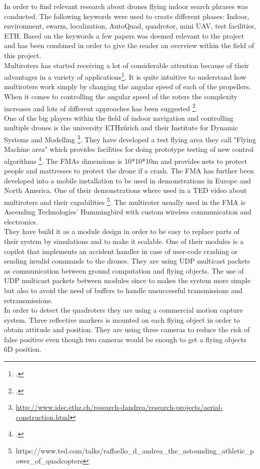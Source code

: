 In order to find relevant research about drones flying indoor search phrases was conducted.
The following keywords were used to create different phases: Indoor, environment, swarm, localization, AutoQuad, quadrotor, mini UAV, test facilities, ETH.
Based on the keywords a few papers was deemed relevant to the project and has been combined in order to give the reader an overview within the field of this project. \\


Multiroters has started receiving a lot of considerable attention because of their advantages in a variety of applications\footcite{kang2015indoor}. It is quite intuitive to understand how multiroters work simply by changing the angular speed of each of the propellers. When it comes to controlling the angular speed of the roters the complexity increases and lots of different approaches has been suggested \footcite{luukkonen2011modelling}. \\


One of the big players within the field of indoor navigation and controlling multiple drones is the university ETHzûrich and their Institute for Dynamic Systems and Modelling \footnote{\url{http://www.idsc.ethz.ch/research-dandrea/research-projects/aerial-construction.html}}. They have developed a test flying area they call "Flying Machine area" which provides facilities for doing prototype testing of new control algorithms \footcite{lupashin2014platform}. The FMAs dimensions is 10*10*10m and provides nets to protect people and mattresses to protect the drone  if a crash. The FMA has further been developed into a mobile installation to be used in demonstrations in Europe and North America. One of their demonstrations where used in a TED video about multiroters and their capabilities \footnote{https://www.ted.com/talks/raffaello\_d\_andrea\_the\_astounding\_athletic\_power\_of\_quadcopters}.
The multiroter usually used in the FMA is Ascending Technologies' Hummingbird with custom wireless communication and electronics. \\
They have build it as a module design in order to be easy to replace parts of their system by simulations and to make it scalable.
One of their modules is a copilot that implements an accident handler in case of user-code crashing or sending invalid commands to the drones.
They are using UDP multicast packets as communication between ground computation and flying objects. The use of UDP multicast packets between modules since to makes the system more simple but also to avoid the need of buffers to handle unsuccessful transmissions and retransmissions. \\
In order to detect the quadroters they are using a commercial motion capture system. Three reflective markers is mounted on each flying object in order to obtain attitude and position. They are using three cameras to reduce the risk of false positive even though two cameras would be enough to get a flying objects 6D position.\\
 
